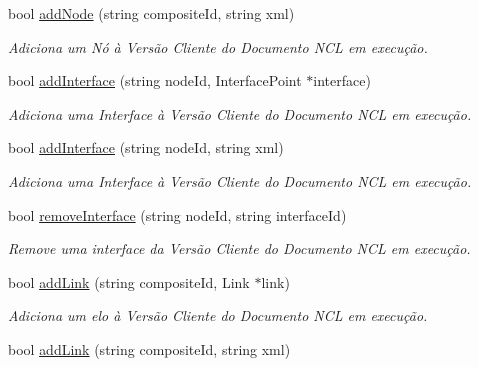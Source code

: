 \begin{DoxyCompactItemize}
bool \hyperlink{classbr_1_1ufscar_1_1lince_1_1ginga_1_1wac_1_1editing_1_1ClientEditingManager_aa7ddb3cd14fd26fe7e4edf8b3024fdb7}{addNode} (string compositeId, string xml)
\begin{DoxyCompactList}\small\item\em Adiciona um Nó à Versão Cliente do Documento NCL em execução. \item\end{DoxyCompactList}\item 
bool \hyperlink{classbr_1_1ufscar_1_1lince_1_1ginga_1_1wac_1_1editing_1_1ClientEditingManager_a7e6eaecc65141d2660bdb1b1c33c421f}{addInterface} (string nodeId, InterfacePoint $\ast$interface)
\begin{DoxyCompactList}\small\item\em Adiciona uma Interface à Versão Cliente do Documento NCL em execução. \item\end{DoxyCompactList}\item 
bool \hyperlink{classbr_1_1ufscar_1_1lince_1_1ginga_1_1wac_1_1editing_1_1ClientEditingManager_a1565a7f4347ad519fc405455c603fb3c}{addInterface} (string nodeId, string xml)
\begin{DoxyCompactList}\small\item\em Adiciona uma Interface à Versão Cliente do Documento NCL em execução. \item\end{DoxyCompactList}\item 
bool \hyperlink{classbr_1_1ufscar_1_1lince_1_1ginga_1_1wac_1_1editing_1_1ClientEditingManager_a23d60db841bf10edd6266de52613b9b2}{removeInterface} (string nodeId, string interfaceId)
\begin{DoxyCompactList}\small\item\em Remove uma interface da Versão Cliente do Documento NCL em execução. \item\end{DoxyCompactList}\item 
bool \hyperlink{classbr_1_1ufscar_1_1lince_1_1ginga_1_1wac_1_1editing_1_1ClientEditingManager_a53cb5ddc1e425c7f03c7aacff140223c}{addLink} (string compositeId, Link $\ast$link)
\begin{DoxyCompactList}\small\item\em Adiciona um elo à Versão Cliente do Documento NCL em execução. \item\end{DoxyCompactList}\item 
bool \hyperlink{classbr_1_1ufscar_1_1lince_1_1ginga_1_1wac_1_1editing_1_1ClientEditingManager_a88c07d75d150d08724ec077fa54f2aeb}{addLink} (string compositeId, string xml)

\end{DoxyCompactItemize}

